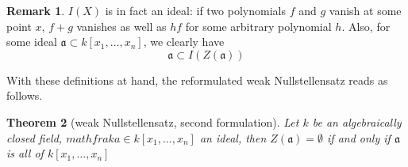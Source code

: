 \documentclass[11pt, a4paper, english, twoside]{article}
\theoremstyle{plain}
\newtheorem{theorem}{Theorem}[section]
\theoremstyle{definition}
\newtheorem{remark}[theorem]{Remark}
\begin{document}
\begin{remark}
    $I(X)$ is in fact an ideal: if two polynomials $f$ and $g$ vanish at some point $x$, $f+g$ vanishes as well as $hf$ for some arbitrary polynomial $h$.
    Also, for some ideal $\mathfrak{a} \subset k[x_1,\dots,x_n]$, we clearly have
    \[
        \mathfrak{a} \subset I(Z(\mathfrak{a}))
    \]
\end{remark}

With these definitions at hand, the reformulated weak Nullstellensatz reads as follows.

\begin{theorem}[weak Nullstellensatz, second formulation]
    Let $k$ be an algebraically closed field, $mathfrak{a} \in k[x_1,\dots,x_n]$ an ideal, then $Z(\mathfrak{a}) = \emptyset$ if and only if $\mathfrak{a}$ is all of $k[x_1,\dots,x_n]$
\end{theorem}
\end{document}
